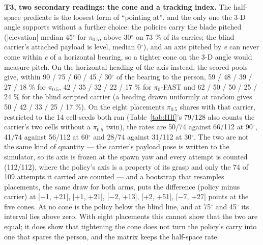 \textbf{T3, two secondary readings: the cone and a tracking index.} The half-space predicate is the loosest form of ``pointing at'', and the only one the 3-D angle supports without a further choice: the policies carry the blade pitched (|elevation| median 45$^{\circ}$ for $\pi_{0.5}$, above 30$^{\circ}$ on 73 \% of its carries; the blind carrier's attached payload is level, median 0$^{\circ}$), and an axis pitched by \emph{e} can never come within \emph{e} of a horizontal bearing, so a tighter cone on the 3-D angle would measure pitch. On the horizontal heading of the axis instead, the scored pools give, within 90 / 75 / 60 / 45 / 30$^{\circ}$ of the bearing to the person, 59 / 48 / 39 / 27 / 18 \% for $\pi_{0.5}$, 42 / 35 / 32 / 22 / 17 \% for $\pi_0$-FAST and 62 / 50 / 50 / 25 / 24 \% for the blind scripted carrier (a heading drawn uniformly at random gives 50 / 42 / 33 / 25 / 17 \%). On the eight placements $\pi_{0.5}$ shares with that carrier, restricted to the 14 cell-seeds both ran (Table~\ref{tab:IIIf}'s 79/128 also counts the carrier's two cells without a $\pi_{0.5}$ twin), the rates are 50/74 against 66/112 at 90$^{\circ}$, 41/74 against 56/112 at 60$^{\circ}$ and 28/74 against 31/112 at 30$^{\circ}$. The two are not the same kind of quantity --- the carrier's payload pose is written to the simulator, so its axis is frozen at the spawn yaw and every attempt is counted (112/112), where the policy's axis is a property of its grasp and only the 74 of 109 attempts it carried are counted --- and a bootstrap that resamples placements, the same draw for both arms, puts the difference (policy minus carrier) at [$-$1, +21], [+1, +21], [$-$2, +13], [+2, +51], [$-$7, +27] points at the five cones. At no cone is the policy below the blind line, and at 75$^{\circ}$ and 45$^{\circ}$ its interval lies above zero. With eight placements this cannot show that the two are equal; it does show that tightening the cone does not turn the policy's carry into one that spares the person, and the matrix keeps the half-space rate.

